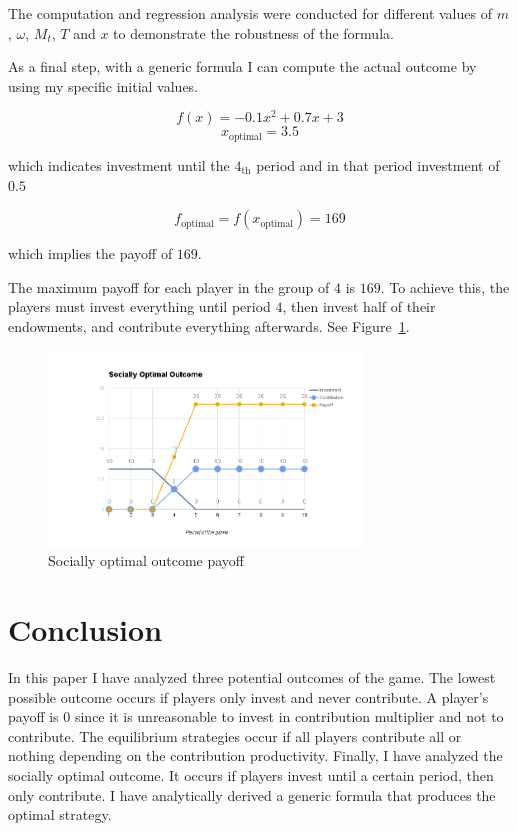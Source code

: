			The computation and regression analysis were conducted for different values of $m$, $\omega$, $M_t$, $T$ and $x$ to demonstrate the robustness of the formula.
			
			As a final step, with a generic formula I can compute the actual outcome by using my specific initial values.
			
			\[
				f(x) = -0.1 x^2 + 0.7 x + 3
			\]
			\[
				x_{\text{optimal}} = 3.5
			\]
			
			which indicates investment until the $4_\text{th}$ period and in that period investment of $0.5$
			
			\[
				f_{\text{optimal}} = f(x_{\text{optimal}}) = 169
			\]
			
			which implies the payoff of $169$.
			
			The maximum payoff for each player in the group of $4$ is $169$.
			To achieve this, the players must invest everything until period $4$,
			then invest half of their endowments, and contribute everything afterwards. See Figure~\ref{fig:social}.

			\begin{figure}
				\begin{center}
					\includegraphics[width=8.4cm]{resources/social.png}
					\caption{Socially optimal outcome payoff} 
					\label{fig:social}
				\end{center}
			\end{figure}

\section{Conclusion}

	In this paper I have analyzed three potential outcomes of the game. The lowest possible outcome occurs if players only invest and never contribute. A player's payoff is $0$ since it is unreasonable to invest in contribution multiplier and not to contribute. The equilibrium strategies occur if all players contribute all or nothing depending on the contribution productivity. Finally, I have analyzed the socially optimal outcome. It occurs if players invest until a certain period, then only contribute. I have analytically derived a generic formula that produces the optimal strategy.

